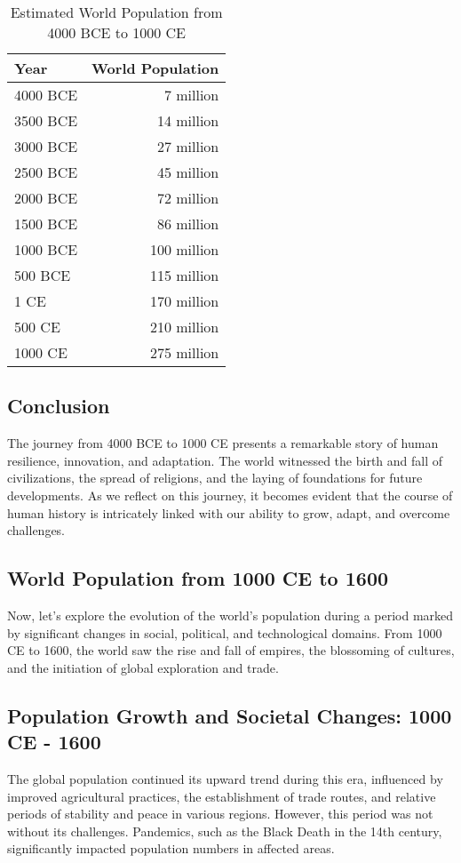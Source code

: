 \documentclass[a4paper,12pt]{book}
\begin{document}
\begin{table}[h!]
\centering
\begin{tabular}{|l|r|}
\hline
Year & World Population \\
\hline
4000 BCE & 7 million \\
3500 BCE & 14 million \\
3000 BCE & 27 million \\
2500 BCE & 45 million \\
2000 BCE & 72 million \\
1500 BCE & 86 million \\
1000 BCE & 100 million \\
500 BCE & 115 million \\
1 CE & 170 million \\
500 CE & 210 million \\
1000 CE & 275 million \\
\hline
\end{tabular}
\caption{Estimated World Population from 4000 BCE to 1000 CE}
\label{tab:world_population}
\end{table}

\subsection*{Conclusion}
The journey from 4000 BCE to 1000 CE presents a remarkable story of human resilience, innovation, and adaptation. The world witnessed the birth and fall of civilizations, the spread of religions, and the laying of foundations for future developments. As we reflect on this journey, it becomes evident that the course of human history is intricately linked with our ability to grow, adapt, and overcome challenges.

\subsection*{World Population from 1000 CE to 1600}
Now, let's explore the evolution of the world's population during a period marked by significant changes in social, political, and technological domains. From 1000 CE to 1600, the world saw the rise and fall of empires, the blossoming of cultures, and the initiation of global exploration and trade.

\subsection*{Population Growth and Societal Changes: 1000 CE - 1600}
The global population continued its upward trend during this era, influenced by improved agricultural practices, the establishment of trade routes, and relative periods of stability and peace in various regions. However, this period was not without its challenges. Pandemics, such as the Black Death in the 14th century, significantly impacted population numbers in affected areas.
\end{document}
